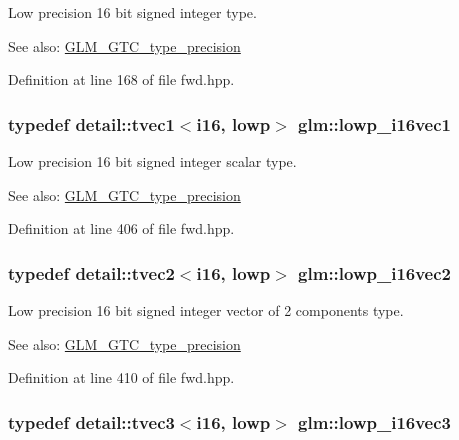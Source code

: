 Low precision 16 bit signed integer type. \begin{Desc}
\item[See also:]\hyperlink{group__gtc__type__precision}{GLM\_\-GTC\_\-type\_\-precision} \end{Desc}


Definition at line 168 of file fwd.hpp.\hypertarget{group__gtc__type__precision_g6f1e42c07424a2f14faf731c74ba2153}{
\subsubsection[lowp\_\-i16vec1]{\setlength{\rightskip}{0pt plus 5cm}typedef detail::tvec1$<$i16, lowp$>$ {\bf glm::lowp\_\-i16vec1}}}
\label{group__gtc__type__precision_g6f1e42c07424a2f14faf731c74ba2153}


Low precision 16 bit signed integer scalar type. \begin{Desc}
\item[See also:]\hyperlink{group__gtc__type__precision}{GLM\_\-GTC\_\-type\_\-precision} \end{Desc}


Definition at line 406 of file fwd.hpp.\hypertarget{group__gtc__type__precision_g47c5d4c919266799ecc76d832356feff}{
\subsubsection[lowp\_\-i16vec2]{\setlength{\rightskip}{0pt plus 5cm}typedef detail::tvec2$<$i16, lowp$>$ {\bf glm::lowp\_\-i16vec2}}}
\label{group__gtc__type__precision_g47c5d4c919266799ecc76d832356feff}


Low precision 16 bit signed integer vector of 2 components type. \begin{Desc}
\item[See also:]\hyperlink{group__gtc__type__precision}{GLM\_\-GTC\_\-type\_\-precision} \end{Desc}


Definition at line 410 of file fwd.hpp.\hypertarget{group__gtc__type__precision_g5b71f24a26316aa21f3c58d25c8db9a8}{
\subsubsection[lowp\_\-i16vec3]{\setlength{\rightskip}{0pt plus 5cm}typedef detail::tvec3$<$i16, lowp$>$ {\bf glm::lowp\_\-i16vec3}}}
\label{group__gtc__type__precision_g5b71f24a26316aa21f3c58d25c8db9a8}


